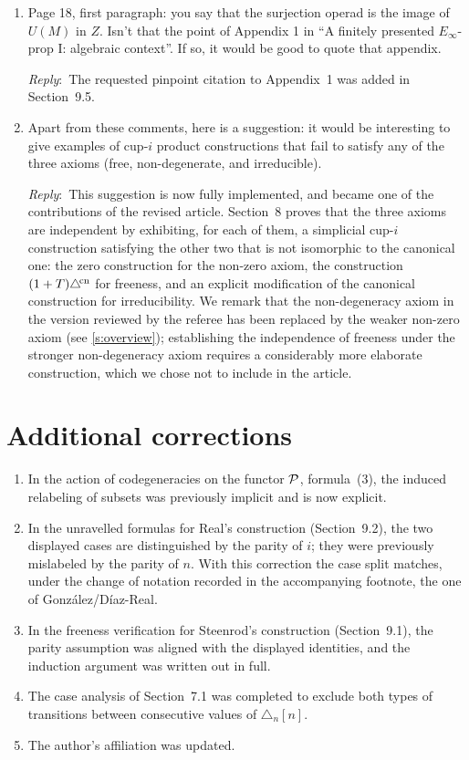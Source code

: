 \documentclass{amsart}
\newcommand{\ar}{\medskip\noindent\textit{Reply}:\ }
\begin{document}
\begin{enumerate}
		\item Page 18, first paragraph: you say that the surjection operad is the image of \(U(M)\) in \(Z\).
		Isn't that the point of Appendix 1 in ``A finitely presented \(E_\infty\)-prop I: algebraic context''. If so, it would be good to quote that appendix.

		\ar The requested pinpoint citation to Appendix~1 was added in Section~9.5.

		\item Apart from these comments, here is a suggestion: it would be interesting to give examples of cup-\(i\) product constructions that fail to satisfy any of the three axioms (free, non-degenerate, and irreducible).

		\ar This suggestion is now fully implemented, and became one of the contributions of the revised article.
		Section~8 proves that the three axioms are independent by exhibiting, for each of them, a simplicial \mbox{cup-$i$} construction satisfying the other two that is not isomorphic to the canonical one: the zero construction for the non-zero axiom, the construction $(1+T)\triangle^{\!\mathrm{cn}}$ for freeness, and an explicit modification of the canonical construction for irreducibility.
		We remark that the non-degeneracy axiom in the version reviewed by the referee has been replaced by the weaker non-zero axiom (see \cref{s:overview}); establishing the independence of freeness under the stronger non-degeneracy axiom requires a considerably more elaborate construction, which we chose not to include in the article.
	\end{enumerate}

	\section{Additional corrections}\label{s:additional}

	\begin{enumerate}
		\item In the action of codegeneracies on the functor $\mathcal{P}$, formula~(3), the induced relabeling of subsets was previously implicit and is now explicit.

		\item In the unravelled formulas for Real's construction (Section~9.2), the two displayed cases are distinguished by the parity of $i$; they were previously mislabeled by the parity of $n$.
		With this correction the case split matches, under the change of notation recorded in the accompanying footnote, the one of Gonz\'alez\-/D\'iaz\--Real.

		\item In the freeness verification for Steenrod's construction (Section~9.1), the parity assumption was aligned with the displayed identities, and the induction argument was written out in full.

		\item The case analysis of Section~7.1 was completed to exclude both types of transitions between consecutive values of $\triangle_n[n]$.

		\item The author's affiliation was updated.
	\end{enumerate}
\end{document}
